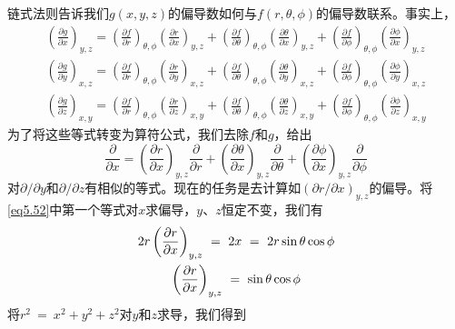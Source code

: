 \documentclass[12pt,a4paper,openany]{ctexbook}
\newcommand{\paren}[1]{\left( #1 \right)}
\begin{document}
\begin{flushleft}
\begin{center}
\begin{minipage}{0.8\textwidth}
    链式法则告诉我们$g(x,y,z)$的偏导数如何与$f(r,\theta,\phi)$的偏导数联系。事实上，
    \begin{gather}
        \left(\frac{\partial g}{\partial x}\right)_{y,z} = \left(\frac{\partial f}{\partial r}\right)_{\theta,\phi}\left(\frac{\partial r}{\partial x}\right)_{y,z}+\left(\frac{\partial f}{\partial \theta}\right)_{\theta,\phi}\left(\frac{\partial \theta}{\partial x}\right)_{y,z}+\left(\frac{\partial f}{\partial \phi}\right)_{\theta,\phi}\left(\frac{\partial \phi}{\partial x}\right)_{y,z} \label{eq5.53} \\ 
        \left(\frac{\partial g}{\partial y}\right)_{x,z} = \left(\frac{\partial f}{\partial r}\right)_{\theta,\phi}\left(\frac{\partial r}{\partial y}\right)_{x,z}+\left(\frac{\partial f}{\partial \theta}\right)_{\theta,\phi}\left(\frac{\partial \theta}{\partial y}\right)_{x,z}+\left(\frac{\partial f}{\partial \phi}\right)_{\theta,\phi}\left(\frac{\partial \phi}{\partial y}\right)_{x,z} \label{eq5.54} \\ 
        \left(\frac{\partial g}{\partial z}\right)_{x,y} = \left(\frac{\partial f}{\partial r}\right)_{\theta,\phi}\left(\frac{\partial r}{\partial z}\right)_{x,y}+\left(\frac{\partial f}{\partial \theta}\right)_{\theta,\phi}\left(\frac{\partial \theta}{\partial z}\right)_{x,y}+\left(\frac{\partial f}{\partial \phi}\right)_{\theta,\phi}\left(\frac{\partial \phi}{\partial z}\right)_{x,y} \label{eq5.55}
    \end{gather}
    为了将这些等式转变为算符公式，我们去除$f$和$g$，给出
    \begin{equation}
        \frac{\partial}{\partial x} = \left(\frac{\partial r}{\partial x}\right)_{y,z}\frac{\partial}{\partial r}+\left(\frac{\partial \theta}{\partial x}\right)_{y,z}\frac{\partial}{\partial \theta}+\left(\frac{\partial \phi}{\partial x}\right)_{y,z}\frac{\partial}{\partial \phi} \label{eq5.56}
    \end{equation}
    对$\partial/\partial y$和$\partial/\partial z$有相似的等式。现在的任务是去计算如$(\partial r/\partial x)_{y,z}$的偏导。将\eqref{eq5.52}中第一个等式对$x$求偏导，$y$、$z$恒定不变，我们有
    \begin{gather}
        2r\paren{\frac{\partial r}{\partial x}}_{y,z}\ =\ 2x\ =\ 2r\sin\theta\cos\phi \notag \\
        \paren{\frac{\partial r}{\partial x}}_{y,z}\ =\ \sin\theta\cos\phi \label{eq5.57}
    \end{gather}
    将$r^2\ =\ x^2+y^2+z^2$对$y$和$z$求导，我们得到
    \begin{equation}

\end{equation}
\end{minipage}
\end{center}
\end{flushleft}
\end{document}
